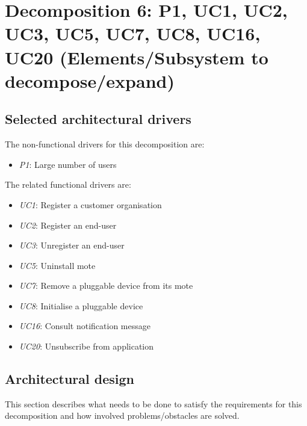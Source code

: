 \section{Decomposition 6: P1, UC1, UC2, UC3, UC5, UC7, UC8, UC16, UC20 (Elements/Subsystem to decompose/expand)}


\subsection{Selected architectural drivers}
    The non-functional drivers for this decomposition are:
    \begin{itemize}
    	\item \emph{P1}: Large number of users
    \end{itemize}

    The related functional drivers are:
    \begin{itemize}
        \item \emph{UC1}: Register a customer organisation \\
        \item \emph{UC2}: Register an end-user \\
        \item \emph{UC3}: Unregister an end-user \\
        \item \emph{UC5}: Uninstall mote \\
        \item \emph{UC7}: Remove a pluggable device from its mote \\
        \item \emph{UC8}: Initialise a pluggable device \\
        \item \emph{UC16}: Consult notification message \\
        \item \emph{UC20}: Unsubscribe from application \\
    \end{itemize}


\subsection{Architectural design}
    This section describes what needs to be done to satisfy the requirements for
    this decomposition and how involved problems/obstacles are solved.

